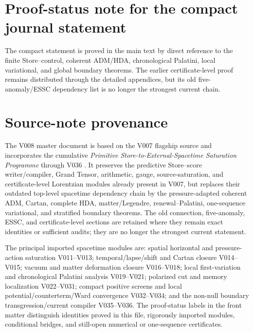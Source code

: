 \documentclass[11pt]{article}
\theoremstyle{definition}
\theoremstyle{remark}
\begin{document}
\section{Proof-status note for the compact journal statement}
\label{app:proof-compact-journal}

The compact statement is proved in the main text by direct reference to the
finite Store--control, coherent ADM/HDA, chronological Palatini, local
variational, and global boundary theorems.  The earlier certificate-level
proof remains distributed through the detailed appendices, but its old
five-anomaly/ESSC dependency list is no longer the strongest current chain.

\section{Source-note provenance}

The V008 master document is based on the V007 flagship source and incorporates
the cumulative \emph{Primitive Store-to-External-Spacetime Saturation
Programme} through V036 \cite{SpacetimeSaturationV036}.  It preserves the
predictive Store--score writer/compiler, Grand Tensor, arithmetic, gauge,
source-saturation, and certificate-level Lorentzian modules already present in
V007, but replaces their outdated top-level spacetime dependency chain by the
pressure-adapted coherent ADM, Cartan, complete HDA, matter/Legendre,
renewal--Palatini, one-sequence variational, and stratified boundary theorems.
The old connection, five-anomaly, ESSC, and certificate-level sections are
retained where they remain exact identities or sufficient audits; they are no
longer the strongest current statement.

The principal imported spacetime modules are: spatial horizontal and
pressure-action saturation V011--V013; temporal/lapse/shift and Cartan closure
V014--V015; vacuum and matter deformation closure V016--V018; local
first-variation and chronological Palatini analysis V019--V021; polarized cut
and memory localization V022--V031; compact positive screens and local
potential/counterterm/Ward convergence V032--V034; and the non-null boundary
transgression/current compiler V035--V036.  The proof-status labels in the
front matter distinguish identities proved in this file, rigorously imported
modules, conditional bridges, and still-open numerical or one-sequence
certificates.
\end{document}
